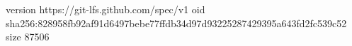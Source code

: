 version https://git-lfs.github.com/spec/v1
oid sha256:828958fb92af91d6497bebe77ffdb34d97d93225287429395a643fd2fc539c52
size 87506
